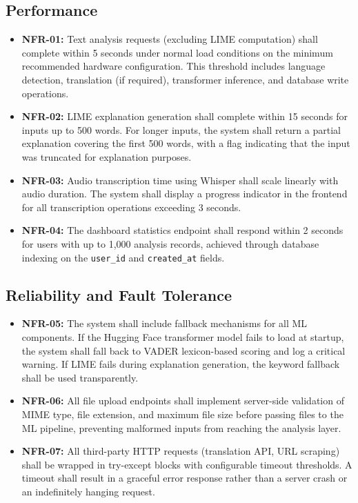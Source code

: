 \documentclass[12pt, a4paper]{report}
\begin{document}
\subsection{Performance}

\begin{itemize}[noitemsep, leftmargin=2em]
    \item \textbf{NFR-01:} Text analysis requests (excluding LIME computation) shall complete within 5 seconds under normal load conditions on the minimum recommended hardware configuration. This threshold includes language detection, translation (if required), transformer inference, and database write operations.
    \item \textbf{NFR-02:} LIME explanation generation shall complete within 15 seconds for inputs up to 500 words. For longer inputs, the system shall return a partial explanation covering the first 500 words, with a flag indicating that the input was truncated for explanation purposes.
    \item \textbf{NFR-03:} Audio transcription time using Whisper shall scale linearly with audio duration. The system shall display a progress indicator in the frontend for all transcription operations exceeding 3 seconds.
    \item \textbf{NFR-04:} The dashboard statistics endpoint shall respond within 2 seconds for users with up to 1,000 analysis records, achieved through database indexing on the \texttt{user\_id} and \texttt{created\_at} fields.
\end{itemize}

\subsection{Reliability and Fault Tolerance}

\begin{itemize}[noitemsep, leftmargin=2em]
    \item \textbf{NFR-05:} The system shall include fallback mechanisms for all ML components. If the Hugging Face transformer model fails to load at startup, the system shall fall back to VADER lexicon-based scoring and log a critical warning. If LIME fails during explanation generation, the keyword fallback shall be used transparently.
    \item \textbf{NFR-06:} All file upload endpoints shall implement server-side validation of MIME type, file extension, and maximum file size before passing files to the ML pipeline, preventing malformed inputs from reaching the analysis layer.
    \item \textbf{NFR-07:} All third-party HTTP requests (translation API, URL scraping) shall be wrapped in try-except blocks with configurable timeout thresholds. A timeout shall result in a graceful error response rather than a server crash or an indefinitely hanging request.
\end{itemize}
\end{document}
